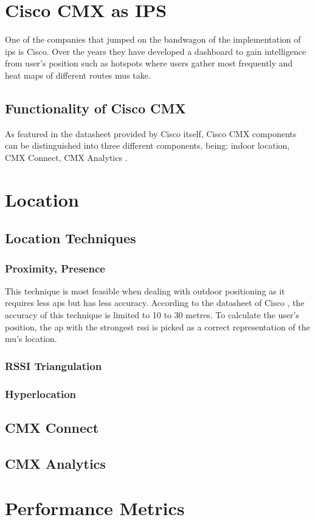 \section{Cisco CMX as IPS}
One of the companies that jumped on the bandwagon of the implementation of \acrlong{ips} is Cisco. Over the years they have developed a dashboard to gain intelligence from user's position such as hotspots where users gather most frequently and heat maps of different routes \acrlong{mu}s take.
\subsection{Functionality of Cisco CMX}
As featured in the datasheet provided by Cisco itself, Cisco CMX components can be distinguished into three different components, being: indoor location, CMX Connect, CMX Analytics \cite{Ciscoa}.
\section{Location}
\subsection{Location Techniques}
\subsubsection{Proximity, Presence}
This technique is most feasible when dealing with outdoor positioning as it requires less \acrlong{ap}s but has less accuracy. According to the datasheet of Cisco \cite{Ciscoa}, the accuracy of this technique is limited to 10 to 30 metres. To calculate the user's position, the \acrshort{ap} with the strongest \acrlong{rssi} is picked as a correct representation of the \acrshort{mu}'s location.
\subsubsection{RSSI Triangulation}
\subsubsection{Hyperlocation}
\subsection{CMX Connect}
\subsection{CMX Analytics}
\section{Performance Metrics}
